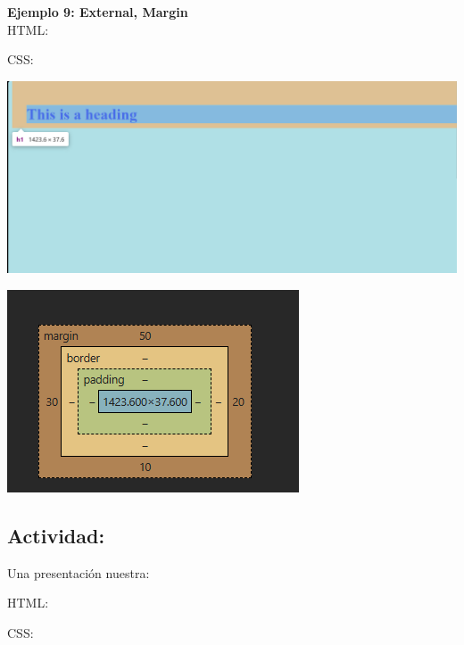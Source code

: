 \documentclass[11pt]{scrartcl}
\begin{document}
\textbf{Ejemplo 9: External, Margin} \\

HTML:




CSS:



\begin{center}
    \includegraphics[scale=0.4]{Ex10.png}
\end{center}
\begin{center}
    \includegraphics[scale=0.8]{Ex10bord.png}
\end{center}

\subsection{Actividad:}
Una presentación nuestra:

HTML:


CSS:

\end{document}

